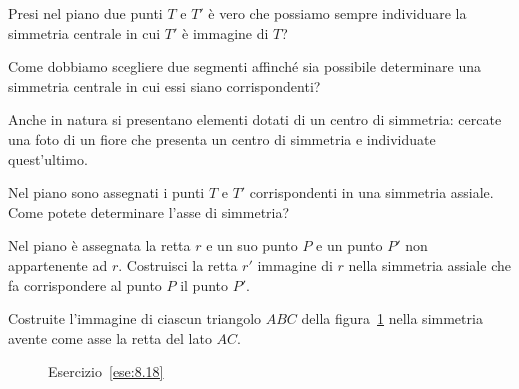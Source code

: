 \begin{esercizio}
\label{ese:8.4}
Presi nel piano due punti \(T\) e \(T'\) è vero che possiamo sempre 
individuare la simmetria centrale in cui \(T'\) è immagine di \(T\)?
\end{esercizio}

\begin{esercizio}
\label{ese:8.5}
Come dobbiamo scegliere due segmenti affinché sia possibile 
determinare una simmetria centrale in cui essi siano corrispondenti?
\end{esercizio}

\begin{esercizio}
\label{ese:8.6}
Anche in natura si presentano elementi dotati di un centro di 
simmetria: cercate una foto di un fiore che presenta un centro di 
simmetria e individuate quest'ultimo.
\end{esercizio}


\begin{esercizio}
\label{ese:8.16}
Nel piano sono assegnati i punti \(T\) e \(T'\) corrispondenti in una 
simmetria assiale. Come potete determinare l'asse di simmetria?
\end{esercizio}

\noindent\begin{minipage}{0.6\textwidth}\parindent15pt
\begin{esercizio}
\label{ese:8.17}
Nel piano è assegnata la retta \(r\) e un suo punto \(P\) e un punto \(P'\) 
non appartenente ad \(r\). Costruisci la retta \(r'\) immagine di \(r\) 
nella simmetria assiale che fa corrispondere al punto \(P\) il punto 
\(P'\).
\end{esercizio}
\end{minipage}\hfil
\begin{minipage}{0.4\textwidth}
	\centering
\end{minipage}\vspace{5pt}

\begin{esercizio}
\label{ese:8.18}
Costruite l'immagine di ciascun triangolo \(ABC\) della 
figura~\ref{fig:ese8.18} nella simmetria avente come asse la retta 
del lato \(AC\).
\end{esercizio}

\begin{inaccessibleblock}
 \begin{figure}[!htb]
	\centering
	\caption{Esercizio~\ref{ese:8.18}}\label{fig:ese8.18}
\end{figure}
\end{inaccessibleblock}

